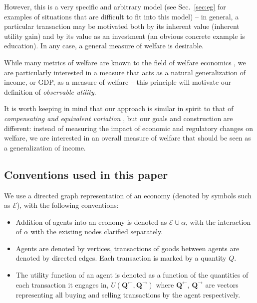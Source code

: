 \documentclass[smallextended]{svjour3}
\newcommand{\economy}{\ensuremath{\mathcal{E}}}
\newcommand{\quants}{\ensuremath{Q}} %
\newcommand{\quantl}{\ensuremath{\mathbf{Q}}} %
\newcommand{\agenta}{\ensuremath{\alpha}}
\newcommand{\utility}{\ensuremath{U}}
\begin{document}
However, this is a very specific and arbitrary model (see Sec.~\ref{sec:eg} for examples of situations that are difficult to fit into this model) -- in general, a particular transaction may be motivated both by its inherent value (inherent utility gain) and by its value as an investment (an obvious concrete example is education). In any case, a general measure of welfare is desirable.

While many metrics of welfare are known to the field of welfare economics \cite{eia}, we are particularly interested in a measure that acts as a natural generalization of income, or GDP, as a measure of welfare -- this principle will motivate our definition of \emph{observable utility}. 

It is worth keeping in mind that our approach is similar in spirit to that of \emph{compensating and equivalent variation} \cite{hicks}\cite{tb}, but our goals and construction are different: instead of measuring the impact of economic and regulatory changes on welfare, we are interested in an overall measure of welfare that should be seen as a generalization of income.

\subsection{Conventions used in this paper}
\label{sec:conv}

We use a directed graph representation of an economy (denoted by symbols such as $\economy$), with the following conventions:
\begin{itemize}
    \item Addition of agents into an economy is denoted as $\economy\cup \agenta$, with the interaction of $\agenta$ with the existing nodes clarified separately.
    \item Agents are denoted by vertices, transactions of goods between agents are denoted by directed edges. Each transaction is marked by a quantity $\quants$.
    \item The utility function of an agent is denoted as a function of the quantities of each transaction it engages in, $\utility(\quantl^\leftarrow, \quantl^\rightarrow)$ where $\quantl^\leftarrow$, $\quantl^\rightarrow$ are vectors representing all buying and selling transactions by the agent respectively.
\end{itemize}
\end{document}
